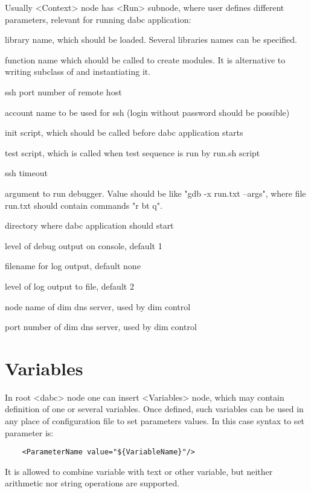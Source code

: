 Usually <Context> node has <Run> subnode, where user defines different parameters, 
relevant for running dabc application:

\bdes
\item[lib] library name, which should be loaded. Several libraries names can be specified.
\item[func] function name which should be called to create modules. 
It is alternative to writing subclass of  and instantiating it.
\item[port] ssh port number of remote host
\item[user] account name to be used for ssh (login without password should be possible)
\item[init] init script, which should be called before dabc application starts
\item[test] test script, which is called when test sequence is run by run.sh script
\item[timeout] ssh timeout 
\item[debugger] argument to run debugger. Value should be like "gdb -x run.txt --args", where file run.txt should contain commands "r bt q".
\item[workdir] directory where dabc application should start
\item[debuglevel] level of debug output on console, default 1
\item[logfile] filename for log output, default none  
\item[loglevel] level of log output to file, default 2 
\item[DIM\_DNS\_NODE] node name of dim dns server, used by dim control 
\item[DIM\_DNS\_PORT] port number of dim dns server, used by dim control 
\edes


\section{Variables}

In root <dabc> node one can insert <Variables> node, which may contain 
definition of one or several variables. Once defined, 
such variables can be used in any place of configuration file to set parameters values.
In this case syntax to set parameter is:

\begin{verbatim}
    <ParameterName value="${VariableName}"/>
\end{verbatim}

It is allowed to combine variable with text or other variable, 
but neither arithmetic nor string operations are supported. 

